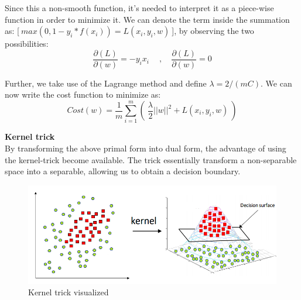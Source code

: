 Since this a non-smooth function, it's needed to interpret it as a piece-wise function in order to minimize it. We can denote the term inside the summation as: [$\ max(0,1-y_i*f(x_i)) = L(x_i,y_i,w)\ $], by observing the two possibilities:
\begin{equation}
	\frac{\partial(L)}{\partial(w)}=-y_ix_i\ \quad , \quad \frac{\partial(L)}{\partial(w)}=0
\end{equation}

Further, we take use of the Lagrange method and define $\lambda = 2/(mC)$. We can now write the cost function to minimize as:
\begin{equation}
	Cost(w) = \frac{1}{m}\sum_{i=1}^m(\ \frac{\lambda}{2}||w||^2+L(x_i,y_i,w)\ )
\end{equation}

\textbf{Kernel trick}\\
By transforming the above primal form into dual form, the advantage of using the kernel-trick become available. The trick essentially transform a non-separable space into a separable, allowing us to obtain a decision boundary.
\begin{figure}[H]
\centering
\includegraphics[scale=0.4]{pictures/kernel.png}
\caption{Kernel trick visualized} 
\end{figure}

